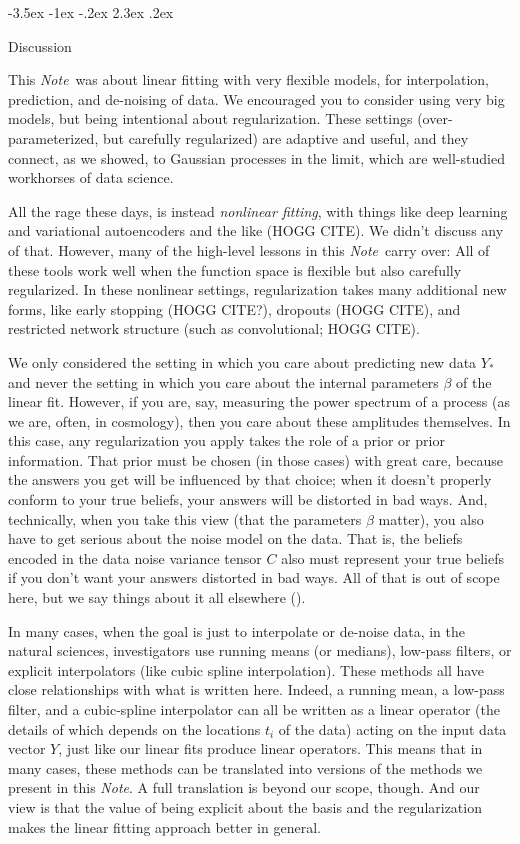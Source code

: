 \documentclass[12pt,letterpaper]{article}
\makeatletter
\renewcommand\section{\@startsection {section}{1}{\z@}%
  {-3.5ex \@plus -1ex \@minus -.2ex}%
  {2.3ex \@plus.2ex}%
  {\raggedright\normalfont\Large\bfseries}}
\newcommand{\documentname}{\textsl{Note}}
\makeatother
\begin{document}
\section{Discussion}\label{sec:discussion}

This \documentname\ was about linear fitting with very flexible models, for interpolation, prediction, and de-noising of data.
We encouraged you to consider using very big models, but being intentional about regularization.
These settings (over-parameterized, but carefully regularized) are adaptive and useful, and they connect, as we showed, to Gaussian processes in the limit, which are well-studied workhorses of data science.

All the rage these days, is instead \emph{nonlinear fitting}, with things like deep learning and variational autoencoders and the like (HOGG CITE).
We didn't discuss any of that.
However, many of the high-level lessons in this \documentname\ carry over:
All of these tools work well when the function space is flexible but also carefully regularized.
In these nonlinear settings, regularization takes many additional new forms, like early stopping (HOGG CITE?), dropouts (HOGG CITE), and restricted network structure (such as convolutional; HOGG CITE).

We only considered the setting in which you care about predicting new data $Y_\ast$ and never the setting in which you care about the internal parameters $\beta$ of the linear fit.
However, if you are, say, measuring the power spectrum of a process (as we are, often, in cosmology), then you care about these amplitudes themselves.
In this case, any regularization you apply takes the role of a prior or prior information.
That prior must be chosen (in those cases) with great care, because the answers you get will be influenced by that choice; when it doesn't properly conform to your true beliefs, your answers will be distorted in bad ways.
And, technically, when you take this view (that the parameters $\beta$ matter), you also have to get serious about the noise model on the data.
That is, the beliefs encoded in the data noise variance tensor $C$ also must represent your true beliefs if you don't want your answers distorted in bad ways.
All of that is out of scope here, but we say things about it all elsewhere (\citealt{fitting}).

In many cases, when the goal is just to interpolate or de-noise data, in the natural sciences, investigators use running means (or medians), low-pass filters, or explicit interpolators (like cubic spline interpolation).
These methods all have close relationships with what is written here.
Indeed, a running mean, a low-pass filter, and a cubic-spline interpolator can all be written as a linear operator (the details of which depends on the locations $t_i$ of the data) acting on the input data vector $Y$, just like our linear fits produce linear operators.
This means that in many cases, these methods can be translated into versions of the methods we present in this \documentname.
A full translation is beyond our scope, though.
And our view is that the value of being explicit about the basis and the regularization makes the linear fitting approach better in general.
\end{document}
